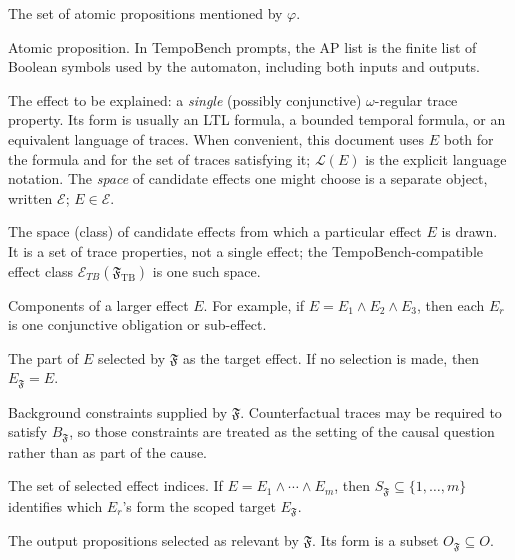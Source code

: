 \documentclass[11pt]{article}
\theoremstyle{remark}
\newcommand{\Effects}{\mathcal{E}}
\newcommand{\AP}{\mathrm{AP}}
\newcommand{\Lang}{\mathcal{L}}
\newcommand{\Frame}{\mathfrak{F}}
\begin{document}
\begin{description}[leftmargin=2.8cm,style=nextline]
  \item[\(\AP(\varphi)\)]
  The set of atomic propositions mentioned by \(\varphi\).

  \item[AP]
  Atomic proposition. In TempoBench prompts, the AP list is the finite list of
  Boolean symbols used by the automaton, including both inputs and outputs.

  \item[\(E\)]
  The effect to be explained: a \emph{single} (possibly conjunctive)
  \(\omega\)-regular trace property. Its form is usually an LTL formula, a bounded
  temporal formula, or an equivalent language of traces. When convenient, this
  document uses \(E\) both for the formula and for the set of traces satisfying
  it; \(\Lang(E)\) is the explicit language notation. The \emph{space} of
  candidate effects one might choose is a separate object, written \(\Effects\);
  \(E\in\Effects\).

  \item[\(\Effects\)]
  The space (class) of candidate effects from which a particular effect \(E\) is
  drawn. It is a set of trace properties, not a single effect; the
  TempoBench-compatible effect class \(\mathcal{E}_{TB}(\Frame_{\mathrm{TB}})\) is
  one such space.

  \item[\(E_1,\ldots,E_m\)]
  Components of a larger effect \(E\). For example, if
  \(E=E_1\land E_2\land E_3\), then each \(E_r\) is one conjunctive obligation
  or sub-effect.

  \item[\(E_{\Frame}\)]
  The part of \(E\) selected by \(\Frame\) as the target effect. If no
  selection is made, then \(E_{\Frame}=E\).

  \item[\(B_{\Frame}\)]
  Background constraints supplied by \(\Frame\). Counterfactual traces may be
  required to satisfy \(B_{\Frame}\), so those constraints are treated as the
  setting of the causal question rather than as part of the cause.

  \item[\(S_{\Frame}\)]
  The set of selected effect indices. If \(E=E_1\land\cdots\land E_m\), then
  \(S_{\Frame}\subseteq\{1,\ldots,m\}\) identifies which \(E_r\)'s form the
  scoped target \(E_{\Frame}\).

  \item[\(O_{\Frame}\)]
  The output propositions selected as relevant by \(\Frame\). Its form is a
  subset \(O_{\Frame}\subseteq O\).


\end{description}
\end{document}
